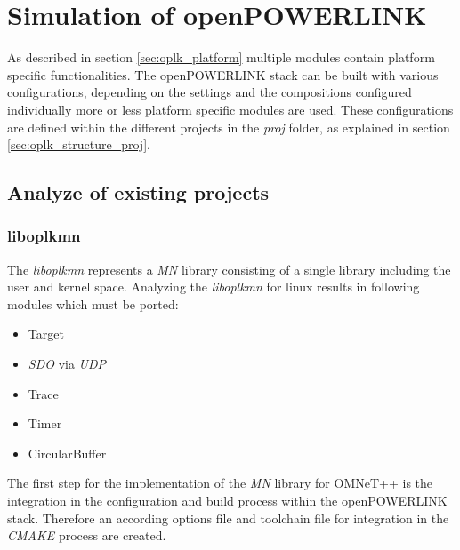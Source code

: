 \chapter{Simulation of openPOWERLINK}
\label{cha:porting}

As described in section \ref{sec:oplk_platform} multiple modules contain platform specific functionalities.
The openPOWERLINK stack can be built with various configurations, depending on the settings and the compositions configured individually more or less platform specific modules are used.
These configurations are defined within the different projects in the \emph{proj} folder, as explained in section \ref{sec:oplk_structure_proj}.

\section{Analyze of existing projects}
\label{cha:porting_projects}

\subsection{liboplkmn}
\label{cha:porting_projects_liboplkmn}

The \emph{liboplkmn} represents a \emph{MN} library consisting of a single library including the user and kernel space.
Analyzing the \emph{liboplkmn} for linux results in following modules which must be ported:

\begin{itemize}
    \item Target
    \item \emph{SDO} via \emph{UDP}
    \item Trace
    \item Timer
    \item CircularBuffer
\end{itemize}

The first step for the implementation of the \emph{MN} library for OMNeT++ is the integration in the configuration and build process within the openPOWERLINK stack.
Therefore an according options file and toolchain file for integration in the \emph{CMAKE} process are created.